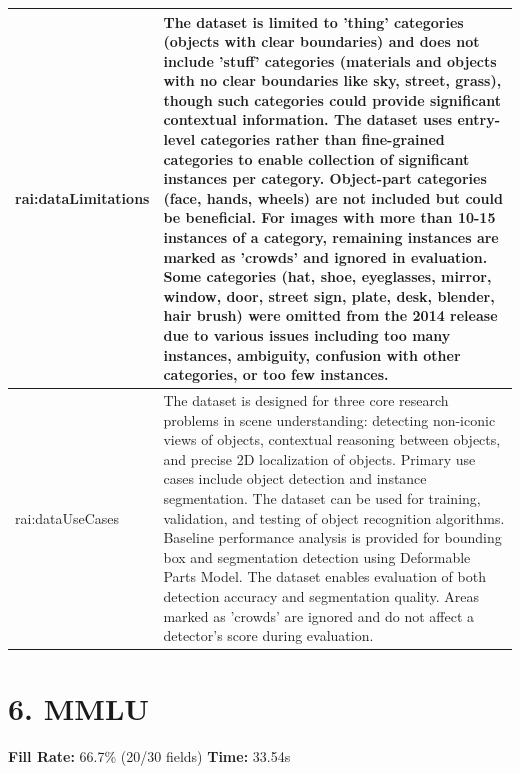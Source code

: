 \documentclass[10pt,a4paper]{article}
\begin{document}
\begin{longtable}{|p{4cm}|p{12cm}|}
rai:dataLimitations & The dataset is limited to 'thing' categories (objects with clear boundaries) and does not include 'stuff' categories (materials and objects with no clear boundaries like sky, street, grass), though such categories could provide significant contextual information. The dataset uses entry-level categories rather than fine-grained categories to enable collection of significant instances per category. Object-part categories (face, hands, wheels) are not included but could be beneficial. For images with more than 10-15 instances of a category, remaining instances are marked as 'crowds' and ignored in evaluation. Some categories (hat, shoe, eyeglasses, mirror, window, door, street sign, plate, desk, blender, hair brush) were omitted from the 2014 release due to various issues including too many instances, ambiguity, confusion with other categories, or too few instances. \\
\hline
rai:dataUseCases & The dataset is designed for three core research problems in scene understanding: detecting non-iconic views of objects, contextual reasoning between objects, and precise 2D localization of objects. Primary use cases include object detection and instance segmentation. The dataset can be used for training, validation, and testing of object recognition algorithms. Baseline performance analysis is provided for bounding box and segmentation detection using Deformable Parts Model. The dataset enables evaluation of both detection accuracy and segmentation quality. Areas marked as 'crowds' are ignored and do not affect a detector's score during evaluation. \\
\hline
\end{longtable}

\newpage

\section*{6. MMLU}
\textbf{Fill Rate:} 66.7\% (20/30 fields) \quad \textbf{Time:} 33.54s
\end{document}
